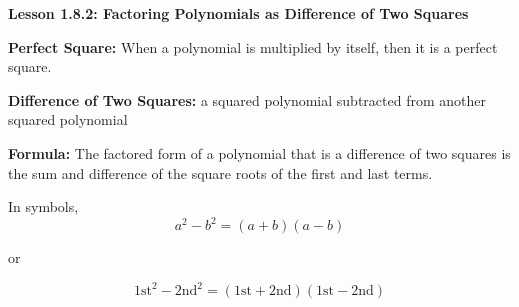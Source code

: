 \begin{center}
\textbf{Lesson 1.8.2: Factoring Polynomials as Difference of Two Squares}
\end{center}

\vspace*{1ex}

\textbf{Perfect Square:} When a polynomial is multiplied by itself, then it is a perfect square.

\textbf{Difference of Two Squares:} a squared polynomial subtracted from another squared polynomial 

\textbf{Formula:}
The factored form of a polynomial that is a difference of two squares is the sum and difference of the square roots of the first and last terms. 
 
In symbols,  
\vspace*{-1ex} 
$$\displaystyle a^{2}-b^{2} = (a+b)(a-b) $$
\vspace*{-6ex} 
\begin{center}
or
\end{center}
\vspace*{-1ex} 
$$ \text{1st}^2 - \text{2nd}^2 = (\text{1st} + \text{2nd})(\text{1st} - \text{2nd}) $$	
